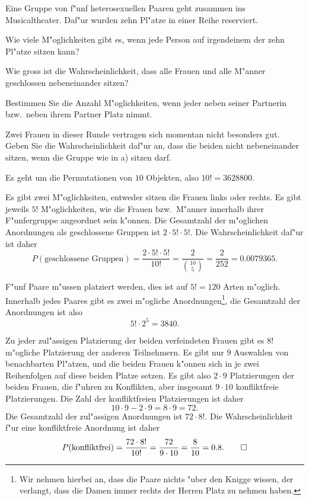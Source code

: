 Eine Gruppe von f"unf heterosexuellen Paaren geht zusammen ins Musicaltheater.
Daf"ur wurden zehn Pl"atze in einer Reihe reserviert.
\begin{teilaufgaben}
\item
Wie viele M"oglichkeiten gibt es, wenn jede Person auf irgendeinem
der zehn Pl"atze sitzen kann?
\item 
Wie gross ist die Wahrscheinlichkeit, dass alle Frauen und alle M"anner
geschlossen nebeneinander sitzen?
\item
Bestimmen Sie die Anzahl M"oglichkeiten, wenn jeder neben seiner Partnerin
bzw.~neben ihrem Partner Platz nimmt.
\item
Zwei Frauen in dieser Runde vertragen sich momentan nicht besonders gut.
Geben Sie die Wahrscheinlichkeit daf"ur an, dass die beiden nicht 
nebeneinander sitzen, wenn die Gruppe wie in a) sitzen
darf.
\end{teilaufgaben}

\begin{loesung}
\begin{teilaufgaben}
\item
Es geht um die Permutationen von $10$ Objekten, also $10!=3628800$.
\item
Es gibt zwei M"oglichkeiten, entweder sitzen die Frauen links oder rechts.
Es gibt jeweils $5!$ M"oglichkeiten, wie die Frauen bzw.~M"anner innerhalb
ihrer F"unfergruppe angeordnet sein k"onnen. Die Gesamtzahl der m"oglichen
Anordnungen als geschlossene Gruppen ist $2\cdot 5!\cdot 5!$.
Die Wahrscheinlichkeit daf"ur ist daher
\[
P(\text{geschlossene Gruppen})
=
\frac{2\cdot 5!\cdot 5!}{10!}
=
\frac{2}{\binom{10}{5}}
=\frac2{252}=0.0079365.
\]
\item
F"unf Paare m"ussen platziert werden, dies ist auf $5!=120$ Arten
m"oglich.
Innerhalb jedes Paares gibt es zwei m"ogliche Anordnungen\footnote{Wir nehmen
hierbei an, dass die Paare nichts "uber den Knigge wissen, der verlangt,
dass die Damen immer rechts der Herren Platz zu nehmen haben.}, die
Gesamtzahl der Anordnungen ist also
\[
5!\cdot 2^5=3840.
\]
\item
Zu jeder zul"assigen Platzierung der beiden verfeindeten Frauen gibt es
$8!$ m"ogliche Platzierung der anderen Teilnehmern.
Es gibt nur $9$ Auswahlen von benachbarten Pl"atzen, und die beiden
Frauen k"onnen sich in je zwei Reihenfolgen auf diese beiden Platze
setzen.
Es gibt also $2\cdot 9$ Platzierungen
der beiden Frauen, die f"uhren zu Konflikten,
aber insgesamt $9\cdot 10$ konfliktfreie Platzierungen.
Die Zahl der konfliktfreien Platzierungen ist daher
\[
10\cdot 9-2\cdot 9= 8\cdot 9 = 72.
\]
Die Gesamtzahl der zul"assigen Anordnungen ist $72\cdot 8!$.
Die Wahrscheinlichkeit f"ur eine konfliktfreie Anordnung ist daher
\[
P(\text{konfliktfrei}) = \frac{72\cdot 8!}{10!}=\frac{72}{9\cdot 10}
=\frac{8}{10}=0.8.
\qedhere
\]
\end{teilaufgaben}
\end{loesung}

